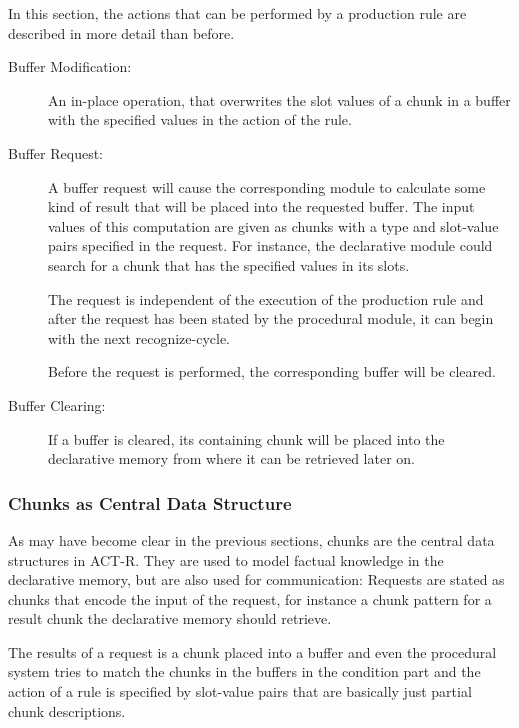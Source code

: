In this section, the actions that can be performed by a production rule are described in more detail than before.

\begin{description}
 \item[Buffer Modification:] 
 
 An in-place operation, that overwrites the slot values of a chunk in a buffer with the specified values in the action of the rule.
 
 \item[Buffer Request:] 
 
 A buffer request will cause the corresponding module to calculate some kind of result that will be placed into the requested buffer. The input values of this computation are given as chunks with a type and slot-value pairs specified in the request. For instance, the declarative module could search for a chunk that has the specified values in its slots.
 
 The request is independent of the execution of the production rule and after the request has been stated by the procedural module, it can begin with the next recognize-cycle.
 
 Before the request is performed, the corresponding buffer will be cleared.
 
 \item[Buffer Clearing:] 
 
 If a buffer is cleared, its containing chunk will be placed into the declarative memory from where it can be retrieved later on.
\end{description}

\subsubsection{Chunks as Central Data Structure}

As may have become clear in the previous sections, chunks are the central data structures in ACT-R. They are used to model factual knowledge in the declarative memory, but are also used for communication: Requests are stated as chunks that encode the input of the request, for instance a chunk pattern for a result chunk the declarative memory should retrieve. 

The results of a request is a chunk placed into a buffer and even the procedural system tries to match the chunks in the buffers in the condition part and the action of a rule is specified by slot-value pairs that are basically just partial chunk descriptions. 

